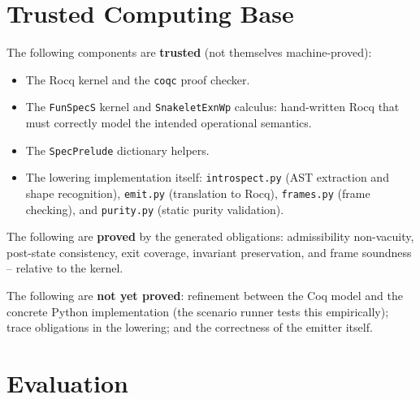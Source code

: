 \documentclass[11pt,a4paper]{article}
\begin{document}
\section{Trusted Computing Base}\label{sec:tcb}

The following components are \textbf{trusted} (not themselves
machine-proved):

\begin{itemize}[nosep]
\item The Rocq kernel and the \texttt{coqc} proof checker.
\item The \texttt{FunSpecS} kernel and \texttt{SnakeletExnWp}
  calculus: hand-written Rocq that must correctly model the intended
  operational semantics.
\item The \texttt{SpecPrelude} dictionary helpers.
\item The lowering implementation itself: \texttt{introspect.py} (AST
  extraction and shape recognition), \texttt{emit.py} (translation to
  Rocq), \texttt{frames.py} (frame checking), and \texttt{purity.py}
  (static purity validation).
\end{itemize}

\noindent The following are \textbf{proved} by the generated obligations:
admissibility non-vacuity, post-state consistency, exit coverage,
invariant preservation, and frame soundness -- relative to the kernel.

\noindent The following are \textbf{not yet proved}:
refinement between the Coq model and the concrete Python
implementation (the scenario runner tests this empirically); trace
obligations in the lowering; and the correctness of the emitter itself.

\section{Evaluation}\label{sec:evaluation}
\end{document}
